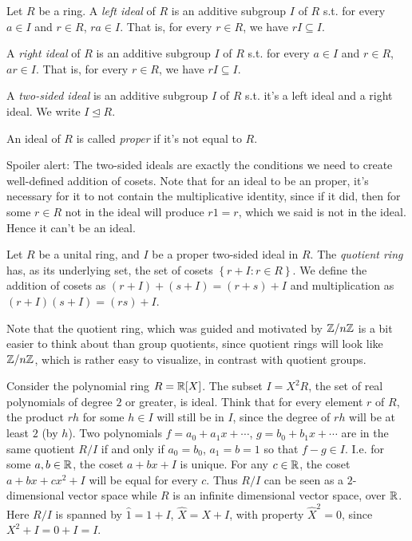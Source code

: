 \begin{definition}
  Let $R$ be a ring. A \emph{left ideal} of $R$ is an additive subgroup $I$ of $R$ s.t.
  for every $a\in I$ and $r\in R$, $ra\in I$. That is, for every $r\in R$, we have
  $rI\subseteq I$.

  A \emph{right ideal} of $R$ is an additive subgroup $I$ of $R$ s.t. for every $a\in I$
  and $r\in R$, $ar\in I$. That is, for every $r\in R$, we have $rI\subseteq I$.

  A \emph{two-sided ideal} is an additive subgroup $I$ of $R$ s.t. it's a left ideal and a
  right ideal. We write $I\trianglelefteq R$.

  An ideal of $R$ is called \emph{proper} if it's not equal to $R$.
  \label{<+label+>}
\end{definition}
Spoiler alert: The two-sided ideals are exactly the conditions we need to create
well-defined addition of cosets. 
Note that for an ideal to be an proper, it's necessary for it to not contain the
multiplicative identity, since if it did, then for some $r\in R$ not in the ideal will
produce $r1=r$, which we said is not in the ideal. Hence it can't be an ideal. 

\begin{definition}
  Let $R$ be a unital ring, and $I$ be a proper two-sided ideal in $R$. The
  \emph{quotient ring} has, as its underlying set, the set of cosets $\left\{ r+I : r\in R
  \right\}$. We define the addition of cosets as $(r+I)+(s+I)=(r+s)+I$ and multiplication
  as $(r+I)(s+I)=(rs)+I$.
  \label{<+label+>}
\end{definition}

Note that the quotient ring, which was guided and motivated by $\mathbb Z/n\mathbb Z$ is a bit easier
to think about than group quotients, since quotient rings will look like $\mathbb Z/n\mathbb Z$, which
is rather easy to visualize, in contrast with quotient groups.
\begin{example}
  Consider the polynomial ring $R=\mathbb R[X]$. The subset $I=X^2 R$, the set of real
  polynomials of degree $2$ or greater, is ideal. Think that for every element $r$ of $R$, the
  product $rh$ for some $h\in I$ will still be in $I$, since the degree of $rh$ will be at
  least $2$ (by $h$). Two polynomials $f=a_0+a_1x+\cdots$, $g=b_0+b_1x+\cdots$ are in the
  same quotient $R/I$ if and only if $a_0=b_0$, $a_1=b=1$ so that $f-g\in I$. I.e. for
  some $a,b\in \mathbb R$, the coset $a+bx+I$ is unique. For any $c\in\mathbb R$, the coset
  $a+bx+cx^2+I$ will be equal for every $c$. Thus $R/I$ can be seen as a $2$-dimensional
  vector space while $R$ is an infinite dimensional vector space, over $\mathbb R$. Here $R/I$
  is spanned by $\hat{1}=1+I$, $\hat{X}=X+I$, with property $\hat{X}^2=0$, since
  $X^2+I=0+I=I$.
\end{example}
